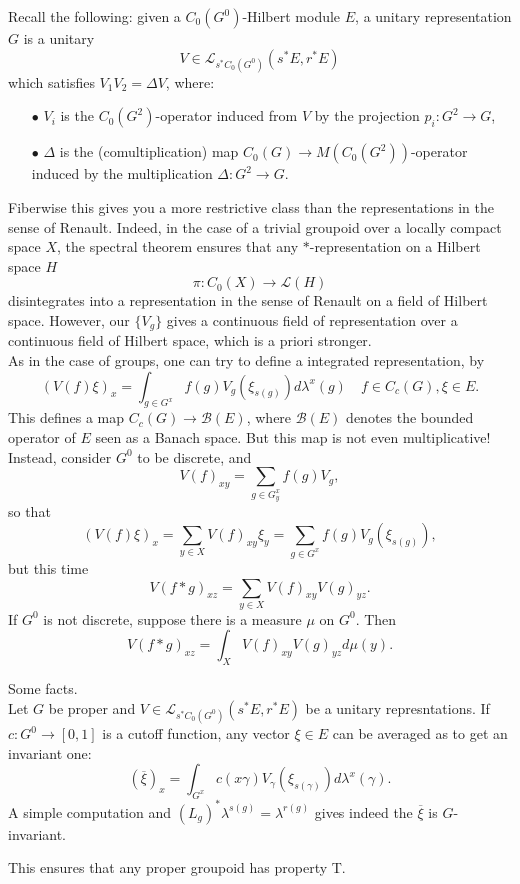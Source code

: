 Recall the following: given a $C_0(G^0)$-Hilbert module $E$, a unitary representation $G$ is a unitary 
\[V \in\mathcal L_{s^* C_0(G^0)}(s^* E, r^* E)\]
which satisfies $V_1 V_2 = \Delta V$, where:\\

\begin{itemize}
\item[$\bullet$] $V_i $ is the $C_0(G^{2})$-operator induced from $V$ by the projection $p_i : G^2 \rightarrow G$,\\
\item[$\bullet$] $\Delta $ is the (comultiplication) map $C_0(G)\rightarrow M(C_0(G^{2}))$-operator induced by the multiplication $\Delta : G^2 \rightarrow G$.\\
\end{itemize}

Fiberwise this gives you a more restrictive class than the representations in the sense of Renault. Indeed, in the case of a trivial groupoid over a locally compact space $X$, the spectral theorem ensures that any $*$-representation on a Hilbert space $H$
\[\pi : C_0(X) \rightarrow \mathcal L(H)\]
disintegrates into a representation in the sense of Renault on a field of Hilbert space. However, our $\{V_g\}$ gives a continuous field of representation over a continuous field of Hilbert space, which is a priori stronger.\\ 

As in the case of groups, one can try to define a integrated representation, by 
\[ (V(f)\xi )_x = \int_{g\in G^x} f(g) V_g (\xi_{s(g)}) d\lambda^x (g) \quad f \in C_c(G) , \xi \in E.\]
This defines a map $C_c(G)\rightarrow \mathcal B(E)$, where $\mathcal B (E)$ denotes the bounded operator of $E$ seen as a Banach space. But this map is not even multiplicative!\\

Instead, consider $G^0$ to be discrete, and 
\[V(f)_{xy} = \sum_{g\in G_y^x} f(g) V_g ,\]
so that 
\[(V(f)\xi)_{x}= \sum_{y\in X} V(f)_{xy} \xi_y = \sum_{g\in G^x} f(g)V_g(\xi_{s(g)}),\]
but this time
\[V(f\ast g)_{xz} = \sum_{y\in X} V(f)_{xy} V(g)_{yz}.\]
If $G^0$ is not discrete, suppose there is a measure $\mu$ on $G^0$. Then
\[V(f\ast g)_{xz} = \int_{X} V(f)_{xy} V(g)_{yz}d\mu(y).\]

Some facts.\\

Let $G$ be proper and $V\in\mathcal L_{s^*C_0(G^0)}(s^*E,r^*E)$ be a unitary represntations. If $c: G^0\rightarrow [0,1]$ is a cutoff function, any vector $\xi\in E$ can be averaged as to get an invariant one:
\[(\overline \xi)_x = \int_{G^x} c(x\gamma) V_\gamma(\xi_{s(\gamma)}) d\lambda^x (\gamma).\]
A simple computation and $(L_g)^*\lambda^{s(g)} = \lambda^{r(g)}$ gives indeed the $\overline \xi $ is $G$-invariant.

This ensures that any proper groupoid has property T. 